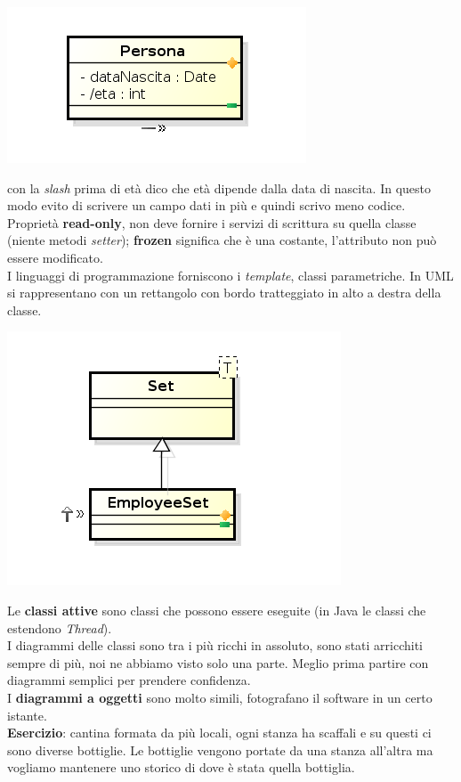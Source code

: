 \begin{center}

\includegraphics[width=0.75\columnwidth]{img1} %

\end{center}

con la \textit{slash} prima di età dico che età dipende dalla data di nascita. In questo modo evito di scrivere un campo dati in più e quindi scrivo meno codice.\\
Proprietà \textbf{read-only}, non deve fornire i servizi di scrittura su quella classe (niente metodi \textit{setter}); \textbf{frozen} significa che è una costante, l'attributo non può essere modificato.\\
I linguaggi di programmazione forniscono i \textit{template}, classi parametriche. In UML si rappresentano con un rettangolo con bordo tratteggiato in alto a destra della classe. 

\begin{center}

\includegraphics[width=0.75\columnwidth]{img2} %

\end{center}

Le \textbf{classi attive} sono classi che possono essere eseguite (in Java le classi che estendono \textit{Thread}).\\
I diagrammi delle classi sono tra i più ricchi in assoluto, sono stati arricchiti sempre di più, noi ne abbiamo visto solo una parte. Meglio prima partire con diagrammi semplici per prendere confidenza.\\
I \textbf{diagrammi a oggetti} sono molto simili, fotografano il software in un certo istante.\\
\textbf{Esercizio}: cantina formata da più locali, ogni stanza ha scaffali e su questi ci sono diverse bottiglie. Le bottiglie vengono portate da una stanza all'altra ma vogliamo mantenere uno storico di dove è stata quella bottiglia.

